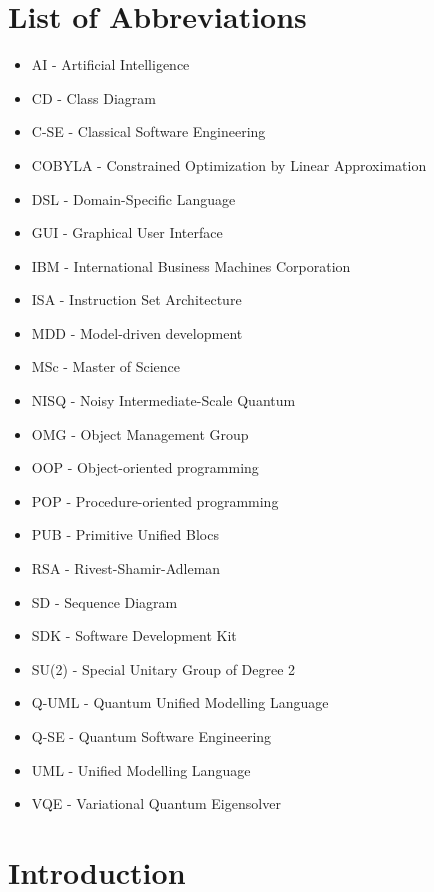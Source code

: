 \documentclass{article}
\begin{document}
\section*{List of Abbreviations}
\begin{itemize}
    \item AI - Artificial Intelligence
    \item CD - Class Diagram
    \item C-SE - Classical Software Engineering
    \item COBYLA - Constrained Optimization by Linear Approximation
    \item DSL - Domain-Specific Language
    \item GUI - Graphical User Interface
    \item IBM - International Business Machines Corporation
    \item ISA - Instruction Set Architecture
    \item MDD - Model-driven development
    \item MSc - Master of Science
    \item NISQ - Noisy Intermediate-Scale Quantum
    \item OMG - Object Management Group
    \item OOP - Object-oriented programming
    \item POP - Procedure-oriented programming
    \item PUB - Primitive Unified Blocs
    \item RSA - Rivest-Shamir-Adleman
    \item SD - Sequence Diagram
    \item SDK - Software Development Kit
    \item SU(2) - Special Unitary Group of Degree 2
    \item Q-UML - Quantum Unified Modelling Language
    \item Q-SE - Quantum Software Engineering
    \item UML - Unified Modelling Language
    \item VQE - Variational Quantum Eigensolver
\end{itemize}
\newpage

\tableofcontents

\newpage

\section{Introduction}
\end{document}
